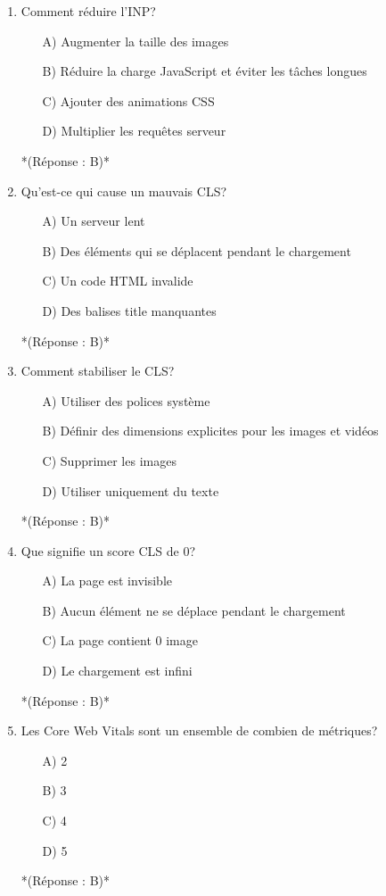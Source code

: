 \documentclass[12pt,a4paper,twoside]{report}
\begin{document}
\begin{enumerate}
\item Comment réduire l'INP?
\begin{itemize}
\item[A)] Augmenter la taille des images
\item[B)] Réduire la charge JavaScript et éviter les tâches longues
\item[C)] Ajouter des animations CSS
\item[D)] Multiplier les requêtes serveur
\end{itemize}
*(Réponse : B)*

\item Qu'est-ce qui cause un mauvais CLS?
\begin{itemize}
\item[A)] Un serveur lent
\item[B)] Des éléments qui se déplacent pendant le chargement
\item[C)] Un code HTML invalide
\item[D)] Des balises title manquantes
\end{itemize}
*(Réponse : B)*

\item Comment stabiliser le CLS?
\begin{itemize}
\item[A)] Utiliser des polices système
\item[B)] Définir des dimensions explicites pour les images et vidéos
\item[C)] Supprimer les images
\item[D)] Utiliser uniquement du texte
\end{itemize}
*(Réponse : B)*

\item Que signifie un score CLS de 0?
\begin{itemize}
\item[A)] La page est invisible
\item[B)] Aucun élément ne se déplace pendant le chargement
\item[C)] La page contient 0 image
\item[D)] Le chargement est infini
\end{itemize}
*(Réponse : B)*

\item Les Core Web Vitals sont un ensemble de combien de métriques?
\begin{itemize}
\item[A)] 2
\item[B)] 3
\item[C)] 4
\item[D)] 5
\end{itemize}
*(Réponse : B)*


\end{enumerate}
\end{document}
